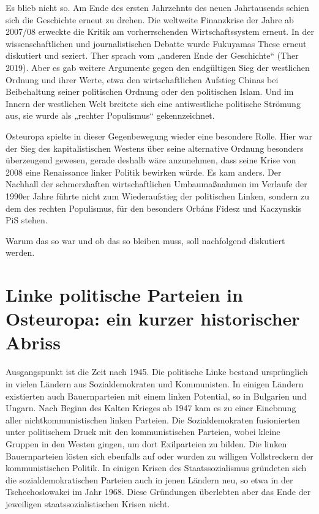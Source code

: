 \begin{multicols*}{2}
Es blieb nicht so. Am Ende des ersten Jahrzehnts des neuen Jahrtausends schien sich die Geschichte erneut zu drehen. Die weltweite Finanzkrise der Jahre ab 2007/08 erweckte die Kritik am vorherrschenden Wirtschaftssystem erneut. In der wissenschaftlichen und journalistischen Debatte wurde Fukuyamas These erneut diskutiert und seziert. Ther sprach vom „anderen Ende der Geschichte“ (Ther 2019). Aber es gab weitere Argumente gegen den endgültigen Sieg der westlichen Ordnung und ihrer Werte, etwa den wirtschaftlichen Aufstieg Chinas bei Beibehaltung seiner politischen Ordnung oder den politischen Islam. Und im Innern der westlichen Welt breitete sich eine antiwestliche politische Strömung aus, sie wurde als „rechter Populismus“ gekennzeichnet. \par

Osteuropa spielte in dieser Gegenbewegung wieder eine besondere Rolle. Hier war der Sieg des kapitalistischen Westens über seine alternative Ordnung besonders überzeugend gewesen, gerade deshalb wäre anzunehmen, dass seine Krise von 2008 eine Renaissance linker Politik bewirken würde. Es kam anders. Der Nachhall der schmerzhaften wirtschaftlichen Umbaumaßnahmen im Verlaufe der 1990er Jahre führte nicht zum Wiederaufstieg der politischen Linken, sondern zu dem des rechten Populismus, für den besonders Orbáns Fidesz und Kaczynskis PiS stehen.\par

Warum das so war und ob das so bleiben muss, soll nachfolgend diskutiert werden. 

\section{Linke politische Parteien in Osteuropa: ein kurzer historischer Abriss}

\noindent Ausgangspunkt ist die Zeit nach 1945. Die politische Linke bestand ursprünglich in vielen Ländern aus Sozialdemokraten und Kommunisten. In einigen Ländern existierten auch Bauernparteien mit einem linken Potential, so in Bulgarien und Ungarn. Nach Beginn des Kalten Krieges ab 1947 kam es zu einer Einebnung aller nichtkommunistischen linken Parteien. Die Sozialdemokraten fusionierten unter politischem Druck mit den kommunistischen Parteien, wobei kleine Gruppen in den Westen gingen, um dort Exilparteien zu bilden. Die linken Bauernparteien lösten sich ebenfalls auf oder wurden zu willigen Vollstreckern der kommunistischen Politik. In einigen Krisen des Staatssozialismus gründeten sich die sozialdemokratischen Parteien auch in jenen Ländern neu, so etwa in der Tschechoslowakei im Jahr 1968. Diese Gründungen überlebten aber das Ende der jeweiligen staatssozialistischen Krisen nicht. 


\end{multicols*}
